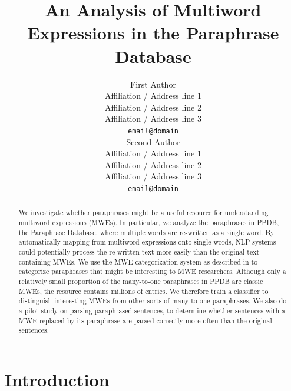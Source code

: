 \documentclass[11pt]{article}
\title{An Analysis of Multiword Expressions in the Paraphrase Database}
\author{First Author \\
  Affiliation / Address line 1 \\
  Affiliation / Address line 2 \\
  Affiliation / Address line 3 \\
  {\tt email@domain} \\\And
  Second Author \\
  Affiliation / Address line 1 \\
  Affiliation / Address line 2 \\
  Affiliation / Address line 3 \\
  {\tt email@domain} \\}
\date{}
\begin{document}
\maketitle
\begin{abstract}
We investigate whether paraphrases might be a useful resource for understanding multiword expressions (MWEs).  In particular, we analyze the paraphrases in PPDB, the Paraphrase Database, where multiple words are re-written as a single word.  By automatically mapping from multiword expressions onto single words, NLP systems could potentially process the re-written text more easily than the original text containing MWEs. We use the MWE categorization system as described in  to categorize paraphrases that might be interesting to MWE researchers.  Although only a relatively small proportion of the many-to-one paraphrases in PPDB are classic MWEs, the resource contains millions of entries.  We therefore train a classifier to distinguish interesting MWEs from other sorts of many-to-one paraphrases. We also do a pilot study on parsing paraphrased sentences, to determine whether sentences with a MWE replaced by its paraphrase are parsed correctly more often than the original sentences.

\end{abstract}

\section{Introduction}
\label{intro}

%
% 
\end{document}
